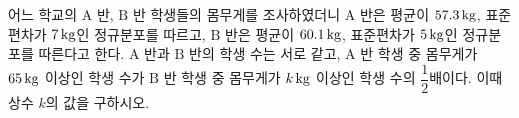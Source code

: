 어느 학교의 $\mathrm{A}$ 반, $\mathrm{B}$ 반 학생들의 몸무게를 조사하였더니 $\mathrm{A}$ 반은 평균이 $57.3\mkern3mu \mathrm{kg}$, 표준편차가 $7\mkern3mu \mathrm{kg}$인 정규분포를 따르고, $\mathrm{B}$ 반은 평균이 $60.1\mkern3mu \mathrm{kg}$, 표준편차가 $5\mkern3mu \mathrm{kg}$인 정규분포를 따른다고 한다. $\mathrm{A}$ 반과 $\mathrm{B}$ 반의 학생 수는 서로 같고, $\mathrm{A}$ 반 학생 중 몸무게가 $65\mkern3mu \mathrm{kg}$ 이상인 학생 수가 $\mathrm{B}$ 반 학생 중 몸무게가 $k\mkern3mu \mathrm{kg}$ 이상인 학생 수의 $\dfrac{1}{2}$배이다. 이때 상수 $k$의 값을 구하시오. 
